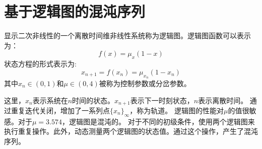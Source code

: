 \section{基于逻辑图的混沌序列}

显示二次非线性的一个离散时间维非线性系统称为逻辑图。逻辑图函数可以表示为：
\begin{equation}
    f(x)=\mu_{x}(1-x) \label{eq:logic graph function 1}
\end{equation}
状态方程的形式表示为:
\begin{equation}
    x_{n+1}=f(x_{n})=\mu_{x_{n}}(1-x_{n}) \label{eq:logic graph function 2}
\end{equation}
其中$x_{n}\in (0,1)$和$\mu\in (0,4)$被称为控制参数或分岔参数。\par
这里，$x_{n}$表示系统在$n$时间的状态。$x_{n+1}$表示下一时刻状态，$n$表示离散时间。
通过重复迭代关闭，增加了一系列点$\{x_{n}\}_\infty$，称为轨道。
逻辑图的性能对$\mu$的值很敏感。对于$\mu=3.574$，逻辑图是混沌的。
对于不同的初级条件，使用两个逻辑图来执行重复操作。此外，动态测量两个逻辑图的状态值。通过这个操作，产生了混沌序列。
